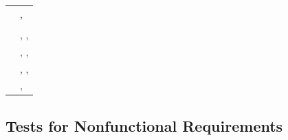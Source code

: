 \documentclass[12pt, titlepage]{article}
\begin{document}
\begin{table}[!h]
\begin{center}
\begin{tabular}{ | m{8cm} | m{8cm} | }
\nameref{TRANS_006} & \nameref{tab:STC_011} \\ \hline
\nameref{TRANS_007} &  \nameref{tab:STC_012}, \nameref{tab:STC_013} \\ \hline
\nameref{TRANS_008} & \nameref{tab:STC_011} \\ \hline
\nameref{TRANS_009} & \nameref{tab:STC_001}, \nameref{tab:STC_002}, \nameref{tab:STC_003} \\ \hline
\nameref{TRANS_010} & \nameref{tab:STC_008}, \nameref{tab:STC_009}, \nameref{tab:STC_010} \\ \hline
\nameref{TRANS_011} & \nameref{tab:STC_008}, \nameref{tab:STC_009}, \nameref{tab:STC_010} \\ \hline
\nameref{TRANS_012} & \nameref{tab:STC_012}, \nameref{tab:STC_010} \\ \hline
\end{tabular}
\end{center}
\end{table}

\clearpage

\subsection{Tests for Nonfunctional Requirements}
\end{document}
